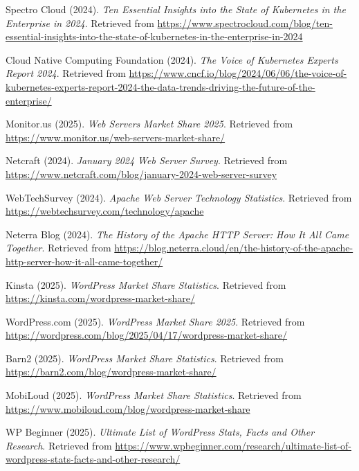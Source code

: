 \documentclass[10pt,a4paper]{article}
\begin{document}
\begin{thebibliography}{99}
Spectro Cloud (2024).
\textit{Ten Essential Insights into the State of Kubernetes in the Enterprise in 2024}.
Retrieved from \url{https://www.spectrocloud.com/blog/ten-essential-insights-into-the-state-of-kubernetes-in-the-enterprise-in-2024}

Cloud Native Computing Foundation (2024).
\textit{The Voice of Kubernetes Experts Report 2024}.
Retrieved from \url{https://www.cncf.io/blog/2024/06/06/the-voice-of-kubernetes-experts-report-2024-the-data-trends-driving-the-future-of-the-enterprise/}

Monitor.us (2025).
\textit{Web Servers Market Share 2025}.
Retrieved from \url{https://www.monitor.us/web-servers-market-share/}

Netcraft (2024).
\textit{January 2024 Web Server Survey}.
Retrieved from \url{https://www.netcraft.com/blog/january-2024-web-server-survey}

WebTechSurvey (2024).
\textit{Apache Web Server Technology Statistics}.
Retrieved from \url{https://webtechsurvey.com/technology/apache}

Neterra Blog (2024).
\textit{The History of the Apache HTTP Server: How It All Came Together}.
Retrieved from \url{https://blog.neterra.cloud/en/the-history-of-the-apache-http-server-how-it-all-came-together/}

Kinsta (2025).
\textit{WordPress Market Share Statistics}.
Retrieved from \url{https://kinsta.com/wordpress-market-share/}

WordPress.com (2025).
\textit{WordPress Market Share 2025}.
Retrieved from \url{https://wordpress.com/blog/2025/04/17/wordpress-market-share/}

Barn2 (2025).
\textit{WordPress Market Share Statistics}.
Retrieved from \url{https://barn2.com/blog/wordpress-market-share/}

MobiLoud (2025).
\textit{WordPress Market Share Statistics}.
Retrieved from \url{https://www.mobiloud.com/blog/wordpress-market-share}

WP Beginner (2025).
\textit{Ultimate List of WordPress Stats, Facts and Other Research}.
Retrieved from \url{https://www.wpbeginner.com/research/ultimate-list-of-wordpress-stats-facts-and-other-research/}


\end{thebibliography}
\end{document}
